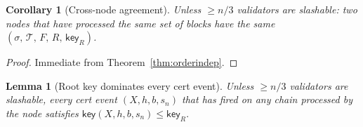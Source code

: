 \ifx\litemode\undefined\documentclass{article}\fi
\newcommand{\T}[0]{\ensuremath{\mathcal{T}}}
\newcommand{\key}{\mathsf{key}}
\theoremstyle{plain}
\newtheorem{corollary}{Corollary}
\newtheorem{lemma}{Lemma}
\theoremstyle{definition}
\theoremstyle{remark}
\begin{document}
\begin{corollary}[Cross-node agreement]\label{cor:agreement}
Unless $\geq n/3$ validators are slashable: two nodes that have processed the same set of blocks have the same $(\sigma,\, \T,\, F,\, R,\, \key_R)$.
\end{corollary}

\begin{proof}
Immediate from Theorem~\ref{thm:orderindep}.
\end{proof}

\begin{lemma}[Root key dominates every cert event]\label{rev:lem:Rs-key-dominates}
Unless $\geq n/3$ validators are slashable, every cert event $(X, h, b, s_n)$ that has fired on any chain processed by the node satisfies $\key(X, h, b, s_n) \leq \key_R$.
\end{lemma}
\end{document}
